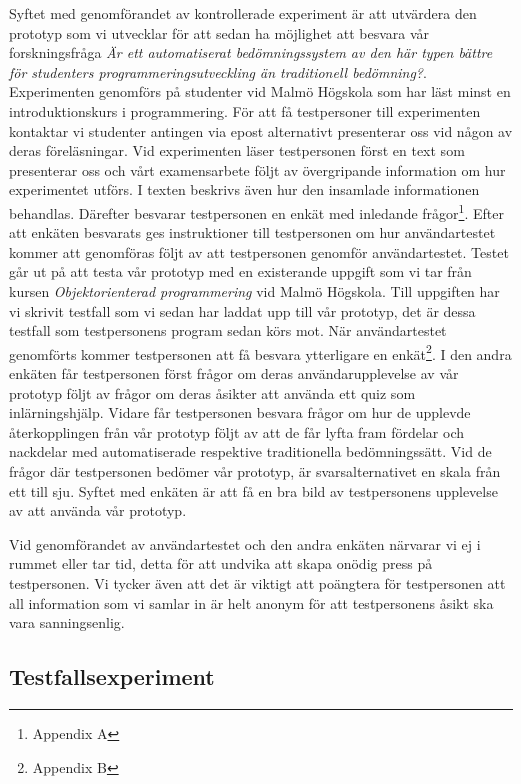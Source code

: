 \documentclass[a4paper,11pt]{article}
\begin{document}
{Syftet med genomförandet av kontrollerade experiment är att utvärdera den prototyp som vi utvecklar för att sedan ha möjlighet att besvara vår forskningsfråga \textit{Är ett automatiserat bedömningssystem av den här typen bättre för studenters programmeringsutveckling än traditionell bedömning?}. Experimenten genomförs på studenter vid Malmö Högskola som har läst minst en introduktionskurs i programmering. För att få testpersoner till experimenten kontaktar vi studenter antingen via epost alternativt presenterar oss vid någon av deras föreläsningar.
Vid experimenten läser testpersonen först en text som presenterar oss och vårt examensarbete följt av övergripande information om hur experimentet utförs. I texten beskrivs även hur den insamlade informationen behandlas. Därefter besvarar testpersonen en enkät med inledande frågor\footnote{Appendix A}. Efter att enkäten besvarats ges instruktioner till testpersonen om hur användartestet kommer att genomföras följt av att testpersonen genomför användartestet. Testet går ut på att testa vår prototyp med en existerande uppgift som vi tar från kursen \textit{Objektorienterad programmering} vid Malmö Högskola. Till uppgiften har vi skrivit testfall som vi sedan har laddat upp till vår prototyp, det är dessa testfall som testpersonens program sedan körs mot. När användartestet genomförts kommer testpersonen att få besvara ytterligare en enkät\footnote{Appendix B}. I den andra enkäten får testpersonen först frågor om deras användarupplevelse av vår prototyp följt av frågor om deras åsikter att använda ett quiz som inlärningshjälp. Vidare får testpersonen besvara frågor om hur de upplevde återkopplingen från vår prototyp följt av att de får lyfta fram fördelar och nackdelar med automatiserade respektive traditionella bedömningssätt. Vid de frågor där testpersonen bedömer vår prototyp, är svarsalternativet en skala från ett till sju. Syftet med enkäten är att få en bra bild av testpersonens upplevelse av att använda vår prototyp. 

Vid genomförandet av användartestet och den andra enkäten närvarar vi ej i rummet eller tar tid, detta för att undvika att skapa onödig press på testpersonen. Vi tycker även att det är viktigt att poängtera för testpersonen att all information som vi samlar in är helt anonym för att testpersonens åsikt ska vara sanningsenlig.

\subsection{Testfallsexperiment}

}
\end{document}

